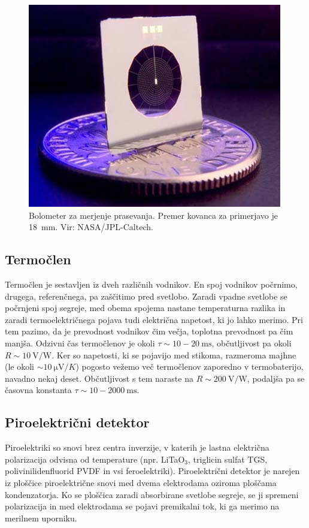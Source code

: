\begin{figure}[h]
\centering
\includegraphics[width=80truemm]{slike/11_Bolometer.jpg}
\caption{Bolometer za merjenje prasevanja. Premer kovanca za primerjavo je 18~mm. 
Vir: NASA/JPL-Caltech.}
\label{fig:Bolometer}
\end{figure}

\subsection*{Termočlen}
Termočlen je sestavljen iz dveh različnih vodnikov. En spoj vodnikov počrnimo, drugega, 
referenčnega, pa zaščitimo pred svetlobo. Zaradi vpadne svetlobe se počrnjeni spoj 
segreje, med obema spojema nastane temperaturna razlika in zaradi termoelektričnega 
pojava tudi električna napetost, ki jo lahko merimo. Pri tem pazimo, da je prevodnost
vodnikov čim večja, toplotna prevodnost pa čim manjša. Odzivni čas termočlenov je 
okoli $\tau \sim 10-20~\si{\milli\second}$, občutljivost pa okoli $R \sim 10~\si{\volt/\watt}$.
Ker so napetosti, ki se pojavijo med stikoma, razmeroma majhne (le okoli 
$\sim 10~\si{\micro\volt/K}$) pogosto vežemo več termočlenov zaporedno v termobaterijo, navadno
nekaj deset. Občutljivost s tem naraste na $R \sim 200~\si{\volt/\watt}$, podaljša 
pa se časovna konstanta $\tau \sim 10-2000~\si{\milli\second}$.

\subsection*{Piroelektrični detektor}
Piroelektriki so snovi brez centra inverzije, v katerih je lastna električna 
polarizacija odvisna od temperature (npr. LiTaO$_3$, triglicin sulfat TGS,
polivinilidenfluorid PVDF in vsi feroelektriki). Piroelektrični detektor je narejen iz 
ploščice piroelektrične snovi med dvema elektrodama oziroma ploščama kondenzatorja.
Ko se ploščica zaradi absorbirane svetlobe segreje, se ji spremeni polarizacija in 
med elektrodama se pojavi premikalni tok, ki ga merimo na merilnem uporniku.

